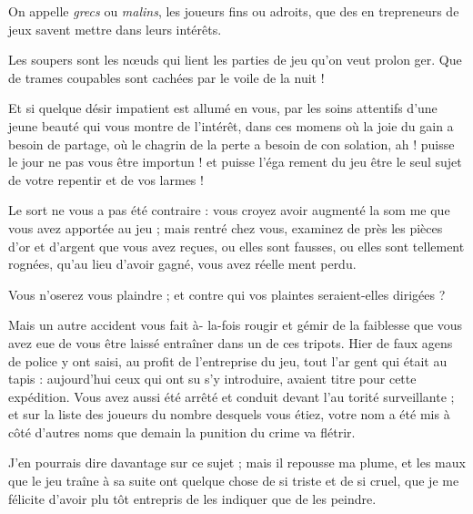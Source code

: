 On appelle \emph{grecs} ou \emph{malins}, les
joueurs fins ou adroits, que des en%
trepreneurs de jeux savent mettre
dans leurs intérêts.

Les soupers sont les n{\oe}uds qui lient
les parties de jeu qu'on veut prolon%
ger. Que de trames coupables sont
cachées par le voile de la nuit !

Et si quelque désir impatient est
allumé en vous, par les soins attentifs
d'une jeune beauté qui vous montre
de l'intérêt, dans ces momens où la
joie du gain a besoin de partage, où
le chagrin de la perte a besoin de con%
solation, ah ! puisse le jour ne pas
vous être importun ! et puisse l'éga%
rement du jeu être le seul sujet de
votre repentir et de vos larmes !

Le sort ne vous a pas été contraire :
vous croyez avoir augmenté la som%
me que vous avez apportée au jeu ;
mais rentré chez vous, examinez de 
près les pièces d'or et d'argent que vous
avez reçues, ou elles sont fausses, ou
elles sont tellement rognées, qu'au
lieu d'avoir gagné, vous avez réelle%
ment perdu.

Vous n'oserez vous plaindre ; et
contre qui vos plaintes seraient-elles
dirigées ?

Mais un autre accident vous fait à-%
la-fois rougir et gémir de la faiblesse
que vous avez eue de vous être laissé
entraîner dans un de ces tripots. Hier
de faux agens de police y ont saisi, au
profit de l'entreprise du jeu, tout l'ar%
gent qui était au tapis : aujourd'hui
ceux qui ont su s'y introduire, avaient
titre pour cette expédition. Vous avez
aussi été arrêté et conduit devant l'au%
torité surveillante ; et sur la liste des
joueurs du nombre desquels vous
étiez, votre nom a été mis à côté
d'autres noms que demain la punition
du crime va flétrir.

J'en pourrais dire davantage sur ce
sujet ; mais il repousse ma plume, et
les maux que le jeu traîne à sa suite
ont quelque chose de si triste et de si
cruel, que je me félicite d'avoir plu%
tôt entrepris de les indiquer que de
les peindre.
